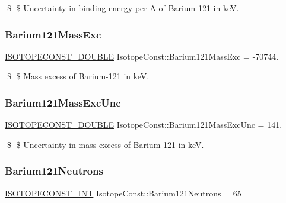 \$ \$ Uncertainty in binding energy per A of Barium-\/121 in keV. \mbox{\label{group___isotope_const-_barium-_ba121_ga636e8bdc5e4314d59582fcb2cf8410e5}} 
\subsubsection{\texorpdfstring{Barium121\+Mass\+Exc}{Barium121MassExc}}
{\footnotesize\ttfamily \mbox{\hyperlink{group___isotope_const-_macros_ga8f45a7272ce02c0b4c65c44636ed719a}{I\+S\+O\+T\+O\+P\+E\+C\+O\+N\+S\+T\+\_\+\+D\+O\+U\+B\+LE}} Isotope\+Const\+::\+Barium121\+Mass\+Exc = -\/70744.}

\$ \$ Mass excess of Barium-\/121 in keV. \mbox{\label{group___isotope_const-_barium-_ba121_ga66220b3156e2535b68a75b30b985ffbb}} 
\subsubsection{\texorpdfstring{Barium121\+Mass\+Exc\+Unc}{Barium121MassExcUnc}}
{\footnotesize\ttfamily \mbox{\hyperlink{group___isotope_const-_macros_ga8f45a7272ce02c0b4c65c44636ed719a}{I\+S\+O\+T\+O\+P\+E\+C\+O\+N\+S\+T\+\_\+\+D\+O\+U\+B\+LE}} Isotope\+Const\+::\+Barium121\+Mass\+Exc\+Unc = 141.}

\$ \$ Uncertainty in mass excess of Barium-\/121 in keV. \mbox{\label{group___isotope_const-_barium-_ba121_gab2d85b5eb3a1e91c9449450f02a077d5}} 
\subsubsection{\texorpdfstring{Barium121\+Neutrons}{Barium121Neutrons}}
{\footnotesize\ttfamily \mbox{\hyperlink{group___isotope_const-_macros_ga5f18360b3e99483a35c32d789e62621c}{I\+S\+O\+T\+O\+P\+E\+C\+O\+N\+S\+T\+\_\+\+I\+NT}} Isotope\+Const\+::\+Barium121\+Neutrons = 65}

